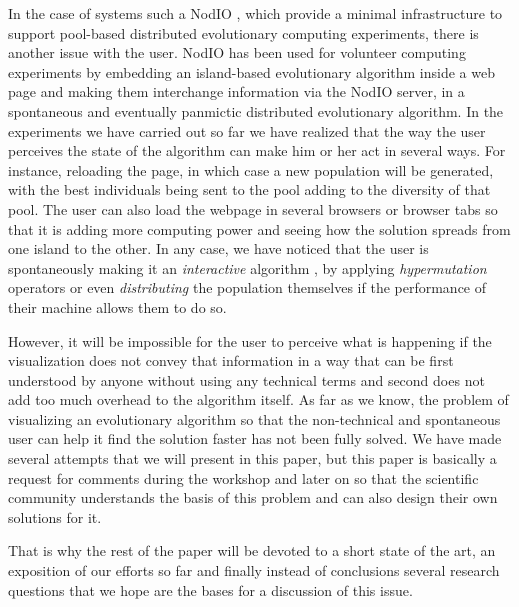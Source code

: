 \documentclass{sig-alternate}
\begin{document}
In the case of systems such a NodIO \cite{2016arXiv160101607M}, which
provide a minimal infrastructure to support pool-based distributed
evolutionary computing experiments, there is another issue with the 
user. NodIO has been used for volunteer computing experiments by
embedding an island-based evolutionary algorithm inside a web page and
making them interchange information via the NodIO server, in a
spontaneous and eventually panmictic distributed evolutionary
algorithm. In the experiments we have carried out so far we have
realized that the way the user perceives the state of the algorithm
can make him or her act in several ways. For instance, reloading the
page, in which case a new population will be generated, with the best
individuals being sent to the pool adding to the diversity of that
pool. The user can also load the webpage in several browsers or
browser tabs so that it is adding more computing power and seeing how the 
solution spreads from one island to the other. In any case, we have noticed
that the user is spontaneously making it an {\em interactive}
algorithm \cite{takagi01interactive}, by applying {\em hypermutation} 
operators or even {\em distributing} the population themselves if the 
performance of their machine allows them to do so. 

However, it will be impossible for the user to perceive what is
happening if the visualization does not convey that information in a
way that can be first understood by anyone without using any technical
terms and second does not add too much overhead to the algorithm
itself. As far as we know, the problem of visualizing an evolutionary
algorithm so that the non-technical and spontaneous user can help it
find the solution faster has not been fully solved. We have made several
attempts that we will present in this paper, but this paper is
basically a request for comments during the workshop and later on so
that the scientific community understands the basis of this problem
and can also design their own solutions for it.

That is why the rest of the paper will be devoted to a short state of
the art, an exposition of our efforts so far and finally instead of
conclusions several research questions that we hope are the bases for
a discussion of this issue.
\end{document}
